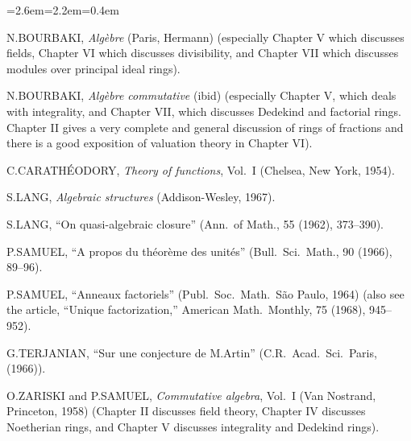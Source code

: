 \begin{list}{}{\leftmargin=2.6em=2.2em=0.4em
  \itemindent=0pt\parindent=0pt\baselineskip\topsep=0pt}
\item[\textbf{[1]}] \label{bib:1}N.\thinspace BOURBAKI, \emph{Algèbre} (Paris, Hermann)
(especially Chapter V which discusses fields, Chapter VI which discusses
divisibility, and Chapter VII which discusses modules over principal ideal
rings).
\item[\textbf{[2]}] \label{bib:2}N.\thinspace BOURBAKI, \emph{Algèbre commutative} (ibid)
(especially Chapter V, which deals with integrality, and Chapter VII, which
discusses Dedekind and factorial rings. Chapter II gives a very complete and
general discussion of rings of fractions and there is a good exposition of
valuation theory in Chapter VI).
\item[\textbf{[3]}] \label{bib:3}C.\thinspace CARATHÉODORY, \emph{Theory of functions},
Vol.~I (Chelsea, New York, 1954).
\item[\textbf{[4]}] \label{bib:4}S.\thinspace LANG, \emph{Algebraic structures}
(Addison-Wesley, 1967).
\item[\textbf{[5]}] \label{bib:5}S.\thinspace LANG, ``On quasi-algebraic closure'' (Ann.\
of Math., 55 (1962), 373--390).
\item[\textbf{[6]}] \label{bib:6}P.\thinspace SAMUEL, ``A propos du théorème des unités''
(Bull.\ Sci.\ Math., 90 (1966), 89--96).
\item[\textbf{[7]}] \label{bib:7}P.\thinspace SAMUEL, ``Anneaux factoriels'' (Publ.\ Soc.\
Math.\ São Paulo, 1964) (also see the article, ``Unique factorization,''
American Math.\ Monthly, 75 (1968), 945--952).
\item[\textbf{[8]}] \label{bib:8}G.\thinspace TERJANIAN, ``Sur une conjecture de
M.\thinspace Artin'' (C.R.\ Acad.\ Sci.\ Paris, (1966)).
\item[\textbf{[9]}] \phantomsection\label{bib:9}O.\thinspace ZARISKI and P.\thinspace SAMUEL,
\emph{Commutative algebra}, Vol.~I (Van Nostrand, Princeton, 1958)
(Chapter II discusses field theory, Chapter IV discusses Noetherian rings,
and Chapter V discusses integrality and Dedekind rings).
\end{list}
